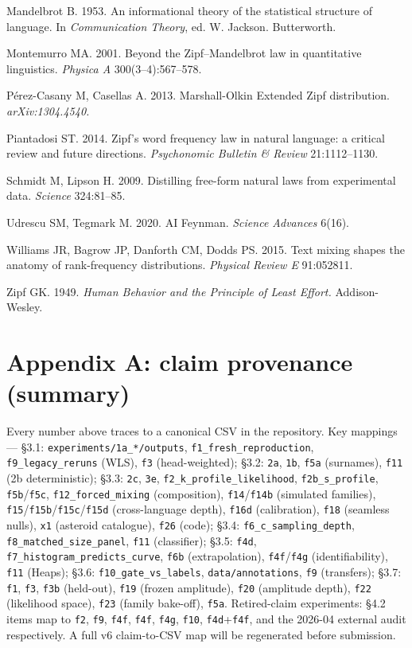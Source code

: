 \documentclass[11pt]{article}
\begin{document}
Mandelbrot B. 1953. An informational theory of the statistical structure of language. In \emph{Communication Theory}, ed. W. Jackson. Butterworth.

Montemurro MA. 2001. Beyond the Zipf--Mandelbrot law in quantitative linguistics. \emph{Physica A} 300(3--4):567--578.

Pérez-Casany M, Casellas A. 2013. Marshall-Olkin Extended Zipf distribution. \emph{arXiv:1304.4540.}

Piantadosi ST. 2014. Zipf's word frequency law in natural language: a critical review and future directions. \emph{Psychonomic Bulletin \& Review} 21:1112--1130.

Schmidt M, Lipson H. 2009. Distilling free-form natural laws from experimental data. \emph{Science} 324:81--85.

Udrescu SM, Tegmark M. 2020. AI Feynman. \emph{Science Advances} 6(16).

Williams JR, Bagrow JP, Danforth CM, Dodds PS. 2015. Text mixing shapes the anatomy of rank-frequency distributions. \emph{Physical Review E} 91:052811.

Zipf GK. 1949. \emph{Human Behavior and the Principle of Least Effort.} Addison-Wesley.

\section*{Appendix A: claim provenance (summary)}
Every number above traces to a canonical CSV in the repository. Key mappings --- \S3.1: \texttt{experiments/1a\_*/outputs}, \texttt{f1\_fresh\_reproduction}, \texttt{f9\_legacy\_reruns} (WLS), \texttt{f3} (head-weighted); \S3.2: \texttt{2a}, \texttt{1b}, \texttt{f5a} (surnames), \texttt{f11} (2b deterministic); \S3.3: \texttt{2c}, \texttt{3e}, \texttt{f2\_k\_profile\_likelihood}, \texttt{f2b\_s\_profile}, \texttt{f5b}/\texttt{f5c}, \texttt{f12\_forced\_mixing} (composition), \texttt{f14}/\texttt{f14b} (simulated families), \texttt{f15}/\texttt{f15b}/\texttt{f15c}/\texttt{f15d} (cross-language depth), \texttt{f16d} (calibration), \texttt{f18} (seamless nulls), \texttt{x1} (asteroid catalogue), \texttt{f26} (code); \S3.4: \texttt{f6\_c\_sampling\_depth}, \texttt{f8\_matched\_size\_panel}, \texttt{f11} (classifier); \S3.5: \texttt{f4d}, \texttt{f7\_histogram\_predicts\_curve}, \texttt{f6b} (extrapolation), \texttt{f4f}/\texttt{f4g} (identifiability), \texttt{f11} (Heaps); \S3.6: \texttt{f10\_gate\_vs\_labels}, \texttt{data/annotations}, \texttt{f9} (transfers); \S3.7: \texttt{f1}, \texttt{f3}, \texttt{f3b} (held-out), \texttt{f19} (frozen amplitude), \texttt{f20} (amplitude depth), \texttt{f22} (likelihood space), \texttt{f23} (family bake-off), \texttt{f5a}. Retired-claim experiments: \S4.2 items map to \texttt{f2}, \texttt{f9}, \texttt{f4f}, \texttt{f4f}, \texttt{f4g}, \texttt{f10}, \texttt{f4d}+\texttt{f4f}, and the 2026-04 external audit respectively. A full v6 claim-to-CSV map will be regenerated before submission.
\end{document}
